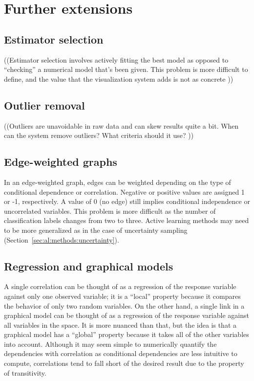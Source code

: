 \section{Further extensions}
\label{sec:futurework}

\subsection{Estimator selection}

((Estimator selection involves actively fitting the best model as opposed to
``checking'' a numerical model that’s been given. This problem is more difficult
to define, and the value that the visualization system adds is not as concrete
))

\subsection{Outlier removal}

((Outliers are unavoidable in raw data and can skew results quite a bit. When
can the system remove outliers? What criteria should it use? ))

\subsection{Edge-weighted graphs}

In an edge-weighted graph, edges can be weighted depending
on the type of conditional dependence or correlation. Negative or positive 
values are assigned 1 or -1, respectively. A value of 0 (no edge) still implies 
conditional independence or uncorrelated variables. This problem is more 
difficult as the number of classification labels changes from two to three. 
Active learning methods may need to be more generalized as in the case of 
uncertainty sampling (Section~\ref{sec:al:methods:uncertainty}). 

\subsection{Regression and graphical models}

A single correlation can be thought of as a regression of the response variable
against only one observed variable; it is a ``local'' property because it
compares the behavior of only two random variables. On the other hand, a single
link in a graphical model can be thought of as a regression of the response
variable against all variables in the space. It is more nuanced than that, but
the idea is that a graphical model has a “global” property because it takes all
of the other variables into account. Although it may seem simple to numerically
quantify the dependencies with correlation as conditional dependencies are less
intuitive to compute, correlations tend to fall short of the desired result due
to the property of transitivity.

